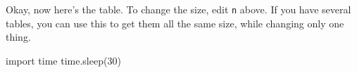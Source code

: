 \documentclass{article}
\begin{document}
Okay, now here's the table. To change the size, edit \texttt{n} above.
If you have several tables, you can use this to get them all the same
size, while changing only one thing.

\begin{center}
\end{center}

\begin{sagesilent}
  import time
  time.sleep(30)
\end{sagesilent}
\end{document}
